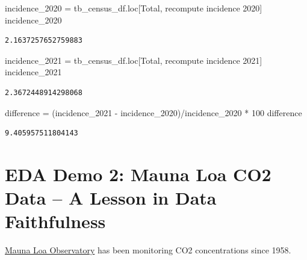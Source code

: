 \documentclass[
  letterpaper,
  DIV=11,
  numbers=noendperiod]{scrreprt}
\newenvironment{Shaded}{\begin{snugshade}}{\end{snugshade}}
\newcommand{\DecValTok}[1]{\textcolor[rgb]{0.68,0.00,0.00}{#1}}
\newcommand{\NormalTok}[1]{\textcolor[rgb]{0.00,0.23,0.31}{#1}}
\newcommand{\OperatorTok}[1]{\textcolor[rgb]{0.37,0.37,0.37}{#1}}
\newcommand{\StringTok}[1]{\textcolor[rgb]{0.13,0.47,0.30}{#1}}
\begin{document}
\begin{Shaded}
\begin{Highlighting}[]
\NormalTok{incidence\_2020 }\OperatorTok{=}\NormalTok{ tb\_census\_df.loc[}\StringTok{\textquotesingle{}Total\textquotesingle{}}\NormalTok{, }\StringTok{\textquotesingle{}recompute incidence 2020\textquotesingle{}}\NormalTok{]}
\NormalTok{incidence\_2020}
\end{Highlighting}
\end{Shaded}

\begin{verbatim}
2.1637257652759883
\end{verbatim}

\begin{Shaded}
\begin{Highlighting}[]
\NormalTok{incidence\_2021 }\OperatorTok{=}\NormalTok{ tb\_census\_df.loc[}\StringTok{\textquotesingle{}Total\textquotesingle{}}\NormalTok{, }\StringTok{\textquotesingle{}recompute incidence 2021\textquotesingle{}}\NormalTok{]}
\NormalTok{incidence\_2021}
\end{Highlighting}
\end{Shaded}

\begin{verbatim}
2.3672448914298068
\end{verbatim}

\begin{Shaded}
\begin{Highlighting}[]
\NormalTok{difference }\OperatorTok{=}\NormalTok{ (incidence\_2021 }\OperatorTok{{-}}\NormalTok{ incidence\_2020)}\OperatorTok{/}\NormalTok{incidence\_2020 }\OperatorTok{*} \DecValTok{100}
\NormalTok{difference}
\end{Highlighting}
\end{Shaded}

\begin{verbatim}
9.405957511804143
\end{verbatim}


\hypertarget{eda-demo-2-mauna-loa-co2-data-a-lesson-in-data-faithfulness}{%
\chapter{EDA Demo 2: Mauna Loa CO2 Data -- A Lesson in Data
Faithfulness}\label{eda-demo-2-mauna-loa-co2-data-a-lesson-in-data-faithfulness}}

\href{https://gml.noaa.gov/ccgg/trends/data.html}{Mauna Loa Observatory}
has been monitoring CO2 concentrations since 1958.
\end{document}
